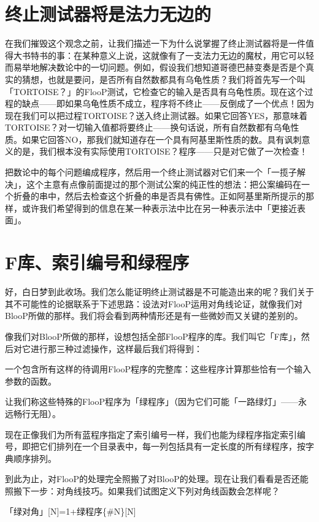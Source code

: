 \documentclass[
  12pt,
  twoside,
  openright,
  oldfontcommands,
]{memoir}
\begin{document}
\section{终止测试器将是法力无边的}

在我们摧毁这个观念之前，让我们描述一下为什么说掌握了终止测试器将是一件值得大书特书的事：在某种意义上说，这就像有了一支法力无边的魔杖，用它可以轻而易举地解决数论中的一切问题。例如，假设我们想知道哥德巴赫变奏是否是个真实的猜想，也就是要问，是否所有自然数都具有乌龟性质？我们将首先写一个叫「TORTOISE？」的FlooP测试，它检查它的输入是否具有乌龟性质。现在这个过程的缺点------即如果乌龟性质不成立，程序将不终止------反倒成了一个优点！因为现在我们可以把过程TORTOISE？送入终止测试器。如果它回答YES，那意味着TORTOISE？对一切输入值都将要终止------换句话说，所有自然数都有乌龟性质。如果它回答NO，那我们就知道存在一个具有阿基里斯性质的数。具有讽刺意义的是，我们根本没有实际使用TORTOISE？程序------只是对它做了一次检查！

把数论中的每个问题编成程序，然后用一个终止测试器对它们来一个「一揽子解决」，这个主意有点像前面提过的那个测试公案的纯正性的想法：把公案编码在一个折叠的串中，然后去检查这个折叠的串是否具有佛性。正如阿基里斯所提示的那样，或许我们希望得到的信息在某一种表示法中比在另一种表示法中「更接近表面」。

\section{F库、索引编号和绿程序}

好，白日梦到此收场。我们怎么能证明终止测试器是不可能造出来的呢？我们关于其不可能性的论据联系于下述思路：设法对FlooP运用对角线论证，就像我们对BlooP所做的那样。我们将会看到两种情形还是有一些微妙而又关键的差别的。

像我们对BlooP所做的那样，设想包括全部FlooP程序的库。我们叫它「F库」，然后对它进行那三种过滤操作，这样最后我们将得到：

一个包含所有这样的待调用FlooP程序的完整库：这些程序计算那些恰有一个输入参数的函数。

让我们称这些特殊的FlooP程序为「绿程序」（因为它们可能「一路绿灯」------永远畅行无阻）。

现在正像我们为所有蓝程序指定了索引编号一样，我们也能为绿程序指定索引编号，即把它们排列在一个目录表中，每一列包括具有一定长度的所有绿程序，按字典顺序排列。

到此为止，对FlooP的处理完全照搬了对BlooP的处理。现在让我们看看是否还能照搬下一步：对角线技巧。如果我们试图定义下列对角线函数会怎样呢？

「绿对角」{[}N{]}=1+绿程序\{\#N\}{[}N{]}
\end{document}
